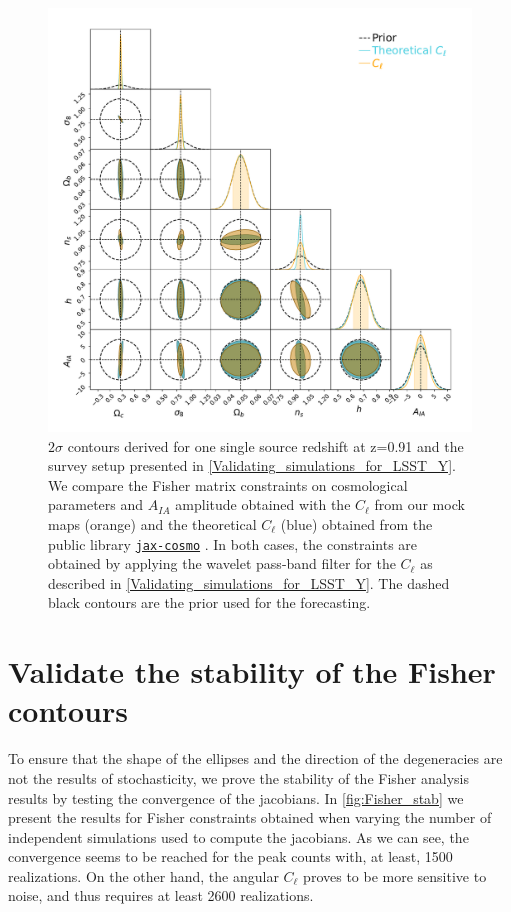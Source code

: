 \documentclass{aa}
\begin{document}
\begin{appendix}
\renewcommand{\thefigure}{A\arabic{figure}}
\setcounter{figure}{0}
 \begin{figure}
    \centering
    \includegraphics[width=\textwidth]{paper/figures/Fisher_IA_theory_n.pdf}
    \caption{ $2\sigma$ contours derived for one single source redshift at z=0.91 and the survey setup presented in \autoref{Validating_simulations_for_LSST_Y}.
    We compare the Fisher matrix constraints on cosmological parameters and $A_{IA}$ amplitude obtained with the $C_{\ell}$ from our mock maps (orange) and the theoretical $C_{\ell}$ (blue) obtained from the public library  \href{https://github.com/DifferentiableUniverseInitiative/jax_cosmo}{\texttt{jax-cosmo}} \citep{Campagne_2023}.  
    In both cases, the constraints are obtained by applying  the wavelet pass-band filter for the $C_{\ell}$ as described in \autoref{Validating_simulations_for_LSST_Y}.
The dashed black contours are the prior used for the forecasting.}
     \label{fig:Fisher_result_theory}
\end{figure}


\section{Validate the stability of the Fisher contours}
To ensure that the shape of the ellipses and the direction of the degeneracies are not the results of stochasticity, we prove the stability of the Fisher analysis results by testing the convergence of the jacobians.
In \autoref{fig:Fisher_stab} we present the results for Fisher constraints obtained when varying the number of independent simulations used to compute the jacobians.  As we can see, the convergence seems to be reached for the peak counts with, at least, 1500 realizations. On the other hand, the angular $C_{\ell}$ proves to be more sensitive to noise, and thus requires at least 2600 realizations.


\end{appendix}
\end{document}
